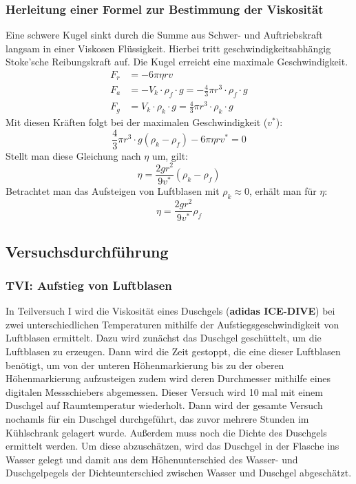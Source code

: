 \documentclass{report}
\begin{document}
\subsubsection*{Herleitung einer Formel zur Bestimmung der Viskosität}
Eine schwere Kugel sinkt durch die Summe aus Schwer- und Auftriebskraft langsam in einer Viskosen Flüssigkeit.
Hierbei tritt geschwindigkeitsabhängig Stoke'sche Reibungskraft auf. Die Kugel erreicht eine maximale Geschwindigkeit.
\begin{equation}
    \begin{split}
        F_r &= -6\pi \eta r v \\
        F_a &= -V_k \cdot \rho_f \cdot g = -\frac{4}{3}\pi r^3 \cdot \rho_f \cdot g\\
        F_g &= V_k \cdot \rho_k \cdot g = \frac{4}{3}\pi r^3 \cdot \rho_k \cdot g
    \end{split}
\end{equation}
Mit diesen Kräften folgt bei der maximalen Geschwindigkeit ($v^*$):
\begin{equation}
    \frac{4}{3}\pi r^3 \cdot g (\rho_k - \rho_f) -6\pi \eta r v^* = 0
\end{equation}
Stellt man diese Gleichung nach $\eta$ um, gilt:
\begin{equation}
    \boxed{\eta = \frac{2gr^2}{9v^*} (\rho_k - \rho_f)}
    \label{eq:viskKugel}
\end{equation}
Betrachtet man das Aufsteigen von Luftblasen mit $\rho_k \approx 0$, erhält man für $\eta$:
\begin{equation}
    \boxed{\eta = \frac{2gr^2}{9v^*} \rho_f}
    \label{eq:viskLuft}
\end{equation}

\subsection{Versuchsdurchführung}
\subsubsection{TVI: Aufstieg von Luftblasen}
In Teilversuch I wird die Viskosität eines Duschgels (\textbf{adidas ICE-DIVE}) bei zwei unterschiedlichen Temperaturen mithilfe der Aufstiegsgeschwindigkeit von Luftblasen ermittelt.
Dazu wird zunächst das Duschgel geschüttelt, um die Luftblasen zu erzeugen. Dann wird die Zeit gestoppt, die eine dieser Luftblasen benötigt, um von der unteren Höhenmarkierung bis zu der oberen Höhenmarkierung aufzusteigen zudem wird
deren Durchmesser mithilfe eines digitalen Messschiebers abgemessen.
Dieser Versuch wird 10 mal mit einem Duschgel auf Raumtemperatur wiederholt. Dann wird der gesamte Versuch nochamls für ein Duschgel durchgeführt, das zuvor mehrere Stunden im Kühlschrank gelagert wurde.
Außerdem muss noch die Dichte des Duschgels ermittelt werden. Um diese abzuschätzen, wird das Duschgel in der Flasche ins Wasser gelegt und damit aus dem Höhenunterschied des Wasser- und Duschgelpegels der 
Dichteunterschied zwischen Wasser und Duschgel abgeschätzt.
\end{document}
